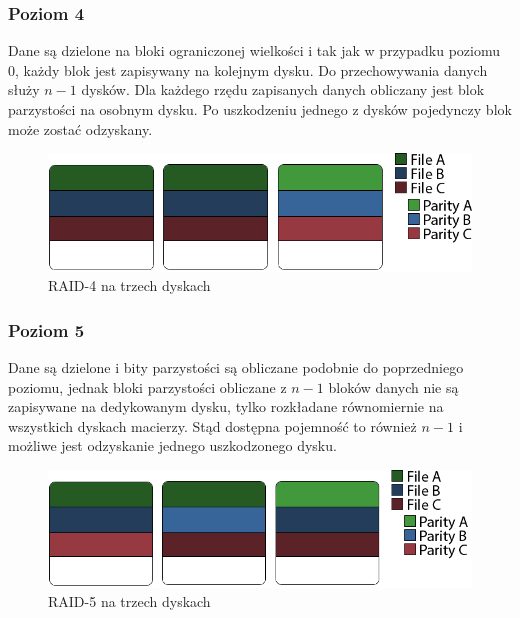 \subsubsection{Poziom 4}
Dane są dzielone na bloki ograniczonej wielkości i tak jak w przypadku poziomu 0, każdy blok jest zapisywany na kolejnym dysku. Do przechowywania danych służy $n-1$ dysków. Dla każdego rzędu zapisanych danych obliczany jest blok parzystości na osobnym dysku. Po uszkodzeniu jednego z dysków pojedynczy blok może zostać odzyskany.
\begin{figure}[h!]
        \centering
        \includegraphics[scale=0.8]{raid-4.png}
        \caption{RAID-4 na trzech dyskach}
        \label{fig:raid4}

\end{figure}
\subsubsection{Poziom 5}
Dane są dzielone i bity parzystości są obliczane podobnie do poprzedniego poziomu, jednak bloki parzystości obliczane z $n-1$ bloków danych nie są zapisywane na dedykowanym dysku, tylko rozkładane równomiernie na wszystkich dyskach macierzy. Stąd dostępna pojemność to również $n-1$ i możliwe jest odzyskanie jednego uszkodzonego dysku.
\begin{figure}[h!]
        \centering
        \includegraphics[scale=0.8]{raid-5.png}
        \caption{RAID-5 na trzech dyskach}
        \label{fig:raid5}
\end{figure}
\newpage
